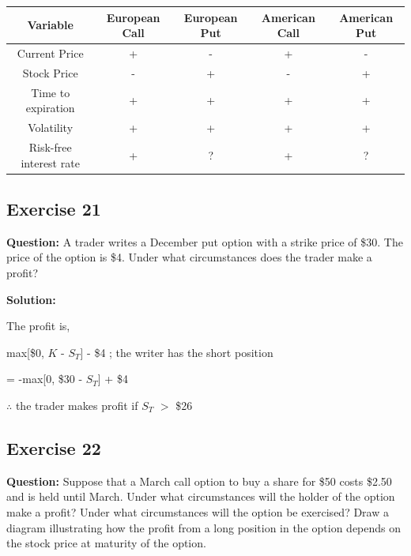 \documentclass{article}
\begin{document}
\newpage

\begin{table}
    \centering
    \begin{tabular}{|c|c|c|c|c|} \hline 
         Variable&  European Call&  European Put&  American Call& American Put\\ \hline 
         Current Price&  +&  -&  +& -\\ \hline 
         Stock Price&  -&  +&  -& +\\ \hline 
         Time to expiration&  +&  +&  +& +\\ \hline 
         Volatility&  +&  +&  +& +\\ \hline 
         Risk-free interest rate&  +&  ?&  +& ?\\ \hline
    \end{tabular}
 
\end{table}

\subsection*{Exercise 21}

\textbf{Question:} A trader writes a December put option with a strike price of \$30. The price of the option is \$4.
Under what circumstances does the trader make a profit?

\textbf{Solution:} 

The profit is,

\vspace{\baselineskip}

max[\$0, $K$ - $S_T$] - \$4 ; the writer has the short position

\vspace{\baselineskip}

= -max[0, \$30 - $S_T$] + \$4

\vspace{\baselineskip}

$\therefore$ the trader makes profit if $S_T$ $>$ \$26 

\subsection*{Exercise 22}

\textbf{Question:} Suppose that a March call option to buy a share for \$50 costs \$2.50 and is held until March. Under
what circumstances will the holder of the option make a profit? Under what circumstances will the option be
exercised? Draw a diagram illustrating how the profit from a long position in the option depends on the stock
price at maturity of the option.
\end{document}
